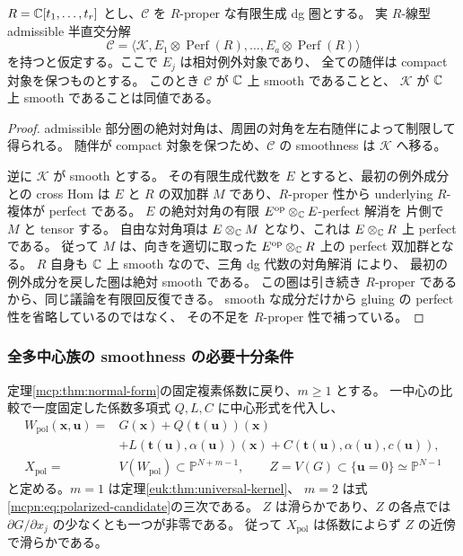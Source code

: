 \begin{lemma}
\label{mcb:lem:relative-gluing}
$R=\mathbb C[t_1,\ldots,t_r]$ とし、$\mathcal C$ を $R$-proper な有限生成 dg 圏とする。
実 $R$-線型 admissible 半直交分解
\[
 \mathcal C=\langle\mathcal K,
       E_1\otimes\operatorname{Perf}(R),\ldots,
       E_a\otimes\operatorname{Perf}(R)\rangle
\]
を持つと仮定する。ここで $E_j$ は相対例外対象であり、
全ての随伴は compact 対象を保つものとする。
このとき $\mathcal C$ が $\mathbb C$ 上 smooth であることと、
$\mathcal K$ が $\mathbb C$ 上 smooth であることは同値である。
\end{lemma}

\begin{proof}
admissible 部分圏の絶対対角は、周囲の対角を左右随伴によって制限して得られる。
随伴が compact 対象を保つため、$\mathcal C$ の smoothness は $\mathcal K$ へ移る。

逆に $\mathcal K$ が smooth とする。
その有限生成代数を $E$ とすると、最初の例外成分との cross Hom は
$E$ と $R$ の双加群 $M$ であり、$R$-proper 性から underlying $R$-複体が perfect である。
$E$ の絶対対角の有限 $E^{\mathrm{op}}\otimes_\mathbb C E$-perfect 解消を
片側で $M$ と tensor する。
自由な対角項は $E\otimes_\mathbb C M$ となり、これは
$E\otimes_\mathbb C R$ 上 perfect である。
従って $M$ は、向きを適切に取った
$E^{\mathrm{op}}\otimes_\mathbb C R$ 上の perfect 双加群となる。
$R$ 自身も $\mathbb C$ 上 smooth なので、三角 dg 代数の対角解消
\cite[Proposition~3.11]{CMOLuntsResolution}により、
最初の例外成分を戻した圏は絶対 smooth である。
この圏は引き続き $R$-proper であるから、同じ議論を有限回反復できる。
smooth な成分だけから gluing の perfect 性を省略しているのではなく、
その不足を $R$-proper 性で補っている。
\end{proof}

\subsubsection{全多中心族の smoothness の必要十分条件}

定理\ref{mcp:thm:normal-form}の固定複素係数に戻り、$m\ge1$ とする。
一中心の比較で一度固定した係数多項式 $Q,L,C$ に中心形式を代入し、
\begin{equation}\label{mcb:eq:polarized}
 \begin{split}
 W_{\mathrm{pol}}(\mathbf x,\mathbf u)
  ={}&G(\mathbf x)+Q(\mathbf t(\mathbf u))(\mathbf x)\\
    &+L(\mathbf t(\mathbf u),\alpha(\mathbf u))(\mathbf x)
      +C(\mathbf t(\mathbf u),\alpha(\mathbf u),c(\mathbf u)),\\
 X_{\mathrm{pol}}={}&V(W_{\mathrm{pol}})\subset\mathbb P^{N+m-1},\qquad
 Z=V(G)\subset\{\mathbf u=0\}\simeq\mathbb P^{N-1}
 \end{split}
\end{equation}
と定める。$m=1$ は定理\ref{euk:thm:universal-kernel}、
$m=2$ は式\eqref{mcpn:eq:polarized-candidate}の三次である。
$Z$ は滑らかであり、$Z$ の各点では $\partial G/\partial x_j$ の少なくとも一つが非零である。
従って $X_{\mathrm{pol}}$ は係数によらず $Z$ の近傍で滑らかである。

